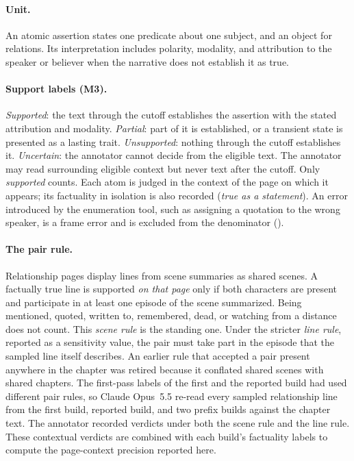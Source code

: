 \paragraph{Unit.} An atomic assertion states one predicate about one subject, and an object
for relations. Its interpretation includes polarity, modality, and attribution to the
speaker or believer when the narrative does not establish it as true.

\paragraph{Support labels (M3).} \emph{Supported}: the text through the cutoff establishes the
assertion with the stated attribution and modality. \emph{Partial}: part of it is established,
or a transient state is presented as a lasting trait. \emph{Unsupported}: nothing through the
cutoff establishes it. \emph{Uncertain}: the annotator cannot decide from the eligible text.
The annotator may read surrounding eligible context but never text after the cutoff. Only
\emph{supported} counts. Each atom is judged in the context of the page on which it appears;
its factuality in isolation is also recorded (\emph{true as a statement}). An error
introduced by the enumeration tool, such as assigning a quotation to the wrong speaker, is a
frame error and is excluded from the denominator ().

\paragraph{The pair rule.} Relationship pages display lines from scene summaries as shared
scenes. A factually true line is supported \emph{on that page} only if both characters are
present and participate in at least one episode of the scene summarized.
Being mentioned, quoted, written to, remembered, dead, or watching from a distance does not
count. This \emph{scene rule} is the standing one. Under the stricter \emph{line rule},
reported as a sensitivity value, the pair must take part in the episode that the sampled
line itself describes. An earlier rule that accepted a pair present anywhere in the chapter
was retired because it conflated shared scenes with shared chapters. The first-pass labels
of the first and the reported build had used different pair rules, so Claude Opus~5.5
re-read every sampled relationship line from the first build, reported build, and two
prefix builds against the chapter text. The annotator recorded verdicts under both the scene rule and the line rule. These contextual
verdicts are combined with each build's factuality labels to compute the page-context
precision reported here.

